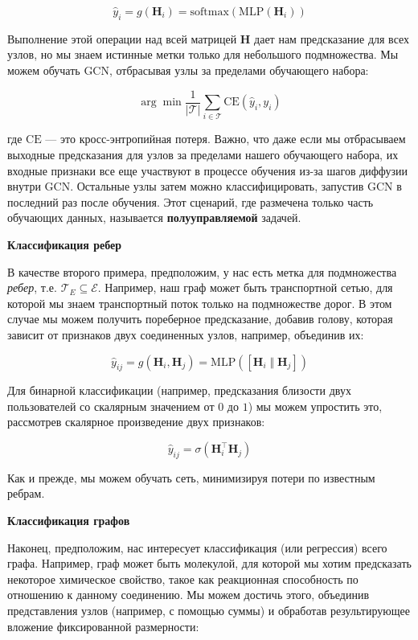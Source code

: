 $$
\hat{y}_i=g(\mathbf{H}_i) =\text{softmax}(\text{MLP}(\mathbf{H}_i))
$$

Выполнение этой операции над всей матрицей $\mathbf{H}$ дает нам предсказание для всех узлов, но мы знаем истинные метки только для небольшого подмножества. Мы можем обучать GCN, отбрасывая узлы за пределами обучающего набора:

$$
\arg\min \frac{1}{\lvert \mathcal{T} \rvert}\sum_{i \in \mathcal{T}} \text{CE}(\hat{y}_i,y_i)
$$

где $\text{CE}$ — это кросс-энтропийная потеря. Важно, что даже если мы отбрасываем выходные предсказания для узлов за пределами нашего обучающего набора, их входные признаки все еще участвуют в процессе обучения из-за шагов диффузии внутри GCN. Остальные узлы затем можно классифицировать, запустив GCN в последний раз после обучения. Этот сценарий, где размечена только часть обучающих данных, называется \textbf{полууправляемой} задачей.

\textbf{Классификация ребер}

В качестве второго примера, предположим, у нас есть метка для подмножества \textit{ребер}, т.е. $\mathcal{T}_E \subseteq \mathcal{E}$. Например, наш граф может быть транспортной сетью, для которой мы знаем транспортный поток только на подмножестве дорог. В этом случае мы можем получить пореберное предсказание, добавив голову, которая зависит от признаков двух соединенных узлов, например, объединив их:

$$
\hat{y}_{ij} = g(\mathbf{H}_i, \mathbf{H}_j)= \text{MLP}\left(\left[ \mathbf{H}_i \;\Vert \; \mathbf{H}_j\right]\right)
$$

Для бинарной классификации (например, предсказания близости двух пользователей со скалярным значением от $0$ до $1$) мы можем упростить это, рассмотрев скалярное произведение двух признаков:

$$
\hat{y}_{ij} = \sigma( \mathbf{H}_i^\top \mathbf{H}_j)
$$

Как и прежде, мы можем обучать сеть, минимизируя потери по известным ребрам.

\textbf{Классификация графов}

Наконец, предположим, нас интересует классификация (или регрессия) всего графа. Например, граф может быть молекулой, для которой мы хотим предсказать некоторое химическое свойство, такое как реакционная способность по отношению к данному соединению. Мы можем достичь этого, объединив представления узлов (например, с помощью суммы) и обработав результирующее вложение фиксированной размерности:

